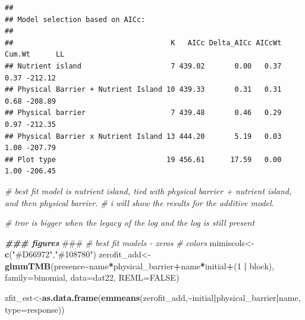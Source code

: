 \documentclass[
]{article}
\newenvironment{Shaded}{\begin{snugshade}}{\end{snugshade}}
\newcommand{\AlertTok}[1]{\textcolor[rgb]{0.94,0.16,0.16}{#1}}
\newcommand{\AttributeTok}[1]{\textcolor[rgb]{0.13,0.29,0.53}{#1}}
\newcommand{\CommentTok}[1]{\textcolor[rgb]{0.56,0.35,0.01}{\textit{#1}}}
\newcommand{\ConstantTok}[1]{\textcolor[rgb]{0.56,0.35,0.01}{#1}}
\newcommand{\DecValTok}[1]{\textcolor[rgb]{0.00,0.00,0.81}{#1}}
\newcommand{\DocumentationTok}[1]{\textcolor[rgb]{0.56,0.35,0.01}{\textbf{\textit{#1}}}}
\newcommand{\FunctionTok}[1]{\textcolor[rgb]{0.13,0.29,0.53}{\textbf{#1}}}
\newcommand{\NormalTok}[1]{#1}
\newcommand{\OtherTok}[1]{\textcolor[rgb]{0.56,0.35,0.01}{#1}}
\newcommand{\SpecialCharTok}[1]{\textcolor[rgb]{0.81,0.36,0.00}{\textbf{#1}}}
\newcommand{\StringTok}[1]{\textcolor[rgb]{0.31,0.60,0.02}{#1}}
\begin{document}
\begin{verbatim}
## 
## Model selection based on AICc:
## 
##                                     K   AICc Delta_AICc AICcWt Cum.Wt      LL
## Nutrient island                     7 439.02       0.00   0.37   0.37 -212.12
## Physical Barrier + Nutrient Island 10 439.33       0.31   0.31   0.68 -208.89
## Physical barrier                    7 439.48       0.46   0.29   0.97 -212.35
## Physical Barrier x Nutrient Island 13 444.20       5.19   0.03   1.00 -207.79
## Plot type                          19 456.61      17.59   0.00   1.00 -206.45
\end{verbatim}

\begin{Shaded}
\begin{Highlighting}[]
\CommentTok{\# best fit model is nutrient island, tied with physical barrier + nutrient island, and then physical barrier.}
\CommentTok{\# i will show the results for the additive model. }

\CommentTok{\# tror is bigger when the legacy of the log and the log is still present}

\DocumentationTok{\#\#\# figures }\AlertTok{\#\#\#}
\CommentTok{\# best fit models {-} zeros }
\CommentTok{\# colors}
\NormalTok{mimiscols}\OtherTok{\textless{}{-}}\FunctionTok{c}\NormalTok{(}\StringTok{"\#D66972"}\NormalTok{,}\StringTok{"\#108780"}\NormalTok{)}
\NormalTok{zerofit\_add}\OtherTok{\textless{}{-}}\FunctionTok{glmmTMB}\NormalTok{(presence}\SpecialCharTok{\textasciitilde{}}\NormalTok{name}\SpecialCharTok{*}\NormalTok{physical\_barrier}\SpecialCharTok{+}\NormalTok{name}\SpecialCharTok{*}\NormalTok{initial}\SpecialCharTok{+}\NormalTok{(}\DecValTok{1} \SpecialCharTok{|}\NormalTok{ block), }\AttributeTok{family=}\NormalTok{binomial, }\AttributeTok{data=}\NormalTok{dat22, }\AttributeTok{REML=}\ConstantTok{FALSE}\NormalTok{)}

\NormalTok{zfit\_est}\OtherTok{\textless{}{-}}\FunctionTok{as.data.frame}\NormalTok{(}\FunctionTok{emmeans}\NormalTok{(zerofit\_add,}\SpecialCharTok{\textasciitilde{}}\NormalTok{initial}\SpecialCharTok{|}\NormalTok{physical\_barrier}\SpecialCharTok{|}\NormalTok{name, }\AttributeTok{type=}\StringTok{\textquotesingle{}response\textquotesingle{}}\NormalTok{))}


\end{Highlighting}
\end{Shaded}
\end{document}
